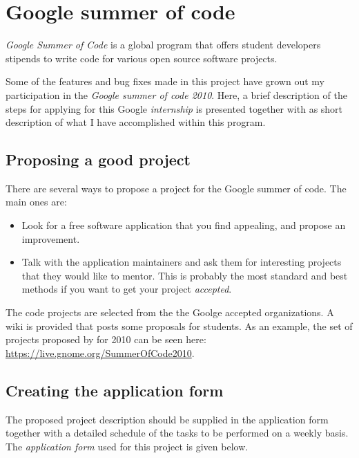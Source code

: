 \chapter{Google summer of code}

\emph{Google Summer of Code} is a global program that offers student developers stipends to write code for various open source software projects.\cite{website:soc}

Some of the features and bug fixes made in this project have grown out my participation in the \emph{Google summer of code 2010}. Here, a brief description of the steps for applying for this Google \emph{internship} is presented together with as short description of what I have accomplished within this program.


\newpage
\section{Proposing a good project}\label{sec:GoodProject}

There are several ways to propose a project for the Google summer of code. The main ones are:
\begin{itemize}
  \item Look for a free software application that you find appealing, and propose an improvement.
  \item Talk with the application maintainers and ask them for interesting projects that they would like to mentor. This is probably the most standard and best methods if you want to get your project \emph{accepted}.
\end{itemize}


The code projects are selected from the the Goolge accepted organizations.   A wiki is provided that posts some proposals for students.  As an example, the set of projects proposed by \GNOME for 2010 can be seen here: \url{https://live.gnome.org/SummerOfCode2010}.

\section{Creating the application form}\label{ApplicationForm}

The proposed project description should be supplied in the application form together with a detailed 
schedule of the tasks to be performed on a weekly basis.   The \emph{application form}  used for this project 
is given below. 
